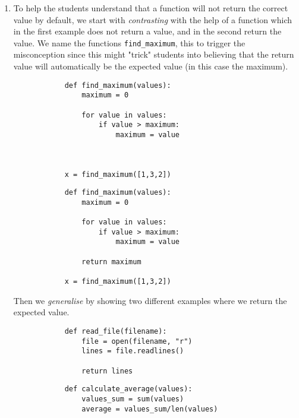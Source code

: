 \begin{enumerate}
    \item To help the students understand that a function will not return 
the correct value by default, we start with \emph{contrasting} with 
the help of a function which in the first example does not return a 
value, and in the second return the value. We name the functions 
\texttt{find_maximum}, this to trigger the misconception 
since this might "trick" students into believing that the return value 
will automatically be the expected value (in this case the maximum). 

    \hfill
     \begin{minipage}[t]{0.45\columnwidth}
        \begin{verbatim}
            def find_maximum(values):
                maximum = 0
    
                for value in values:
                    if value > maximum:
                        maximum = value 


            
            x = find_maximum([1,3,2])
        \end{verbatim}
    \end{minipage}
\hfill
    \begin{minipage}[t]{0.45\columnwidth}
        \begin{verbatim}
            def find_maximum(values):
                maximum = 0
    
                for value in values:
                    if value > maximum:
                        maximum = value
                        
                return maximum
            
            x = find_maximum([1,3,2])
        \end{verbatim}
    \end{minipage}
\hfill

    Then we \emph{generalise} by showing two different examples where we 
return the expected value. 
     \hfill
        \begin{verbatim}
            def read_file(filename):
                file = open(filename, "r")
                lines = file.readlines()
    
                return lines
        \end{verbatim}

\hfill

        \begin{verbatim}
            def calculate_average(values):
                values_sum = sum(values)
                average = values_sum/len(values)
         

\end{verbatim}
\end{enumerate}

